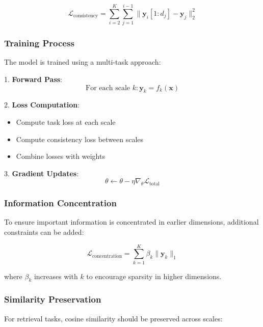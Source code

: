 \begin{equation}
    \mathcal{L}_{\text{consistency}} = \sum_{i=2}^K \sum_{j=1}^{i-1} \|\mathbf{y}_i[1:d_j] - \mathbf{y}_j\|_2^2
\end{equation}

\subsubsection{Training Process}

The model is trained using a multi-task approach:

1. \textbf{Forward Pass}:
   \begin{equation}
       \text{For each scale } k: \mathbf{y}_k = f_k(\mathbf{x})
   \end{equation}

2. \textbf{Loss Computation}:
   \begin{itemize}
       \item Compute task loss at each scale
       \item Compute consistency loss between scales
       \item Combine losses with weights
   \end{itemize}

3. \textbf{Gradient Updates}:
   \begin{equation}
       \theta \leftarrow \theta - \eta \nabla_\theta \mathcal{L}_{\text{total}}
   \end{equation}

\subsubsection{Information Concentration}

To ensure important information is concentrated in earlier dimensions, additional constraints can be added:

\begin{equation}
    \mathcal{L}_{\text{concentration}} = \sum_{k=1}^K \beta_k \|\mathbf{y}_k\|_1
\end{equation}

where $\beta_k$ increases with $k$ to encourage sparsity in higher dimensions.

\subsubsection{Similarity Preservation}

For retrieval tasks, cosine similarity should be preserved across scales:

